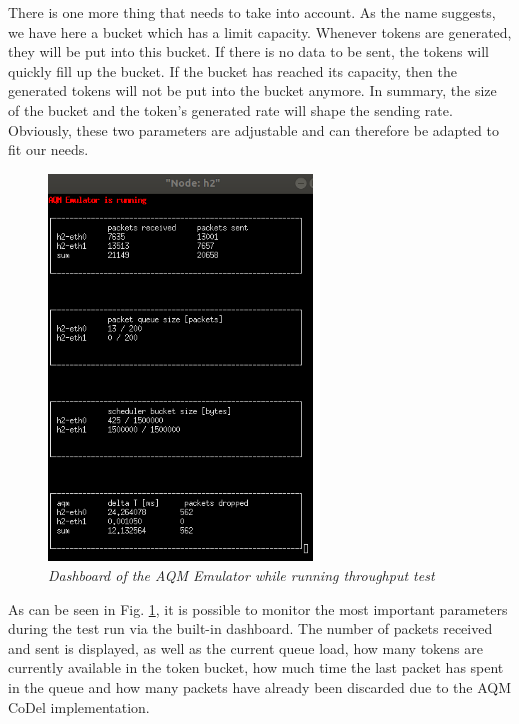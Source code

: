 There is one more thing that needs to take into account. As the name suggests, we have here a bucket which has a limit capacity. Whenever tokens are generated, they will be put into this bucket. If there is no data to be sent, the tokens will quickly fill up the bucket. If the bucket has reached its capacity, then the generated tokens will not be put into the bucket anymore. In summary, the size of the bucket and the token's generated rate will shape the sending rate. Obviously, these two parameters are adjustable and can therefore be adapted to fit our needs. 

\begin{figure}[htbp]
\centering
\includegraphics*[width=7cm]{task2Dashboard}
\caption{\em Dashboard of the AQM Emulator while running throughput test}
\label{fig:aqmEmulator_dashboard}
\end{figure}
As can be seen in Fig. \ref{fig:aqmEmulator_dashboard}, it is possible to monitor the most important parameters during the test run via the built-in dashboard. The number of packets received and sent is displayed, as well as the current queue load, how many tokens are currently available in the token bucket, how much time the last packet has spent in the queue and how many packets have already been discarded due to the AQM CoDel implementation.
